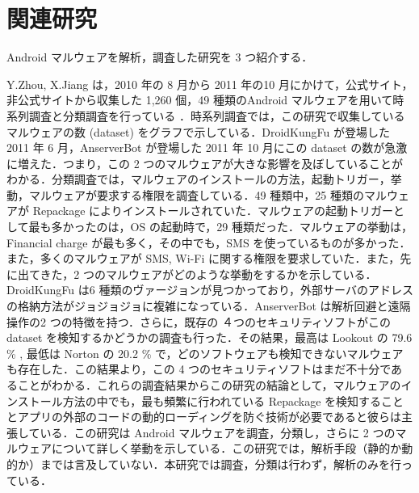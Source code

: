 \section{関連研究}
 Android マルウェアを解析，調査した研究を 3 つ紹介する．

Y.Zhou, X.Jiang は，2010 年の 8 月から 2011 年の10 月にかけて，公式サイト，非公式サイトから収集した 1,260 個，49 種類のAndroid マルウェアを用いて時系列調査と分類調査を行っている \cite{dissect} ．時系列調査では，この研究で収集しているマルウェアの数 (dataset) をグラフで示している．DroidKungFu が登場した 2011 年 6 月，AnserverBot が登場した 2011 年 10 月にこの dataset の数が急激に増えた．つまり，この 2 つのマルウェアが大きな影響を及ぼしていることがわかる．分類調査では，マルウェアのインストールの方法，起動トリガー，挙動，マルウェアが要求する権限を調査している．49 種類中，25 種類のマルウェアが Repackage によりインストールされていた．マルウェアの起動トリガーとして最も多かったのは，OS の起動時で，29 種類だった．マルウェアの挙動は，Financial charge が最も多く，その中でも，SMS を使っているものが多かった．また，多くのマルウェアが SMS, Wi-Fi に関する権限を要求していた．また，先に出てきた，2 つのマルウェアがどのような挙動をするかを示している．DroidKungFu は6 種類のヴァージョンが見つかっており，外部サーバのアドレスの格納方法がジョジョジョに複雑になっている．AnserverBot は解析回避と遠隔操作の2 つの特徴を持つ．さらに，既存の ４つのセキュリティソフトがこの  dataset を検知するかどうかの調査も行った．その結果，最高は Lookout の 79.6 \% , 最低は Norton の 20.2 \% で，どのソフトウェアも検知できないマルウェアも存在した．この結果より，この 4 つのセキュリティソフトはまだ不十分であることがわかる．これらの調査結果からこの研究の結論として，マルウェアのインストール方法の中でも，最も頻繁に行われている Repackage を検知することとアプリの外部のコードの動的ローディングを防ぐ技術が必要であると彼らは主張している．この研究は Android マルウェアを調査，分類し，さらに 2 つのマルウェアについて詳しく挙動を示している．この研究では，解析手段（静的か動的か）までは言及していない．本研究では調査，分類は行わず，解析のみを行っている．

